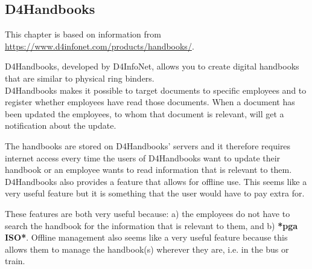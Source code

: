 \subsection{D4Handbooks}
This chapter is based on information
from \url{https://www.d4infonet.com/products/handbooks/}.

D4Handbooks, developed by D4InfoNet, allows you to create digital handbooks that are similar to physical ring binders.\\
D4Handbooks makes it possible to target documents to specific employees and to register whether employees have read those documents. When a document has been updated the employees, to whom that document is relevant, will get a notification about the update.

The handbooks are stored on D4Handbooks' servers and it therefore requires internet access every time the users of D4Handbooks want to update their handbook or an employee wants to read information that is relevant to them.\\
D4Handbooks also provides a feature that allows for offline use. This seems like a very useful feature but it is something that the user would have to pay extra for.

These features are both very useful because: a) the employees do not have to search the handbook for the information that is relevant to them, and b) \textbf{*pga ISO*}.
Offline management also seems like a very useful feature because this allows them to manage the handbook(s) wherever they are, i.e. in the bus or train.
